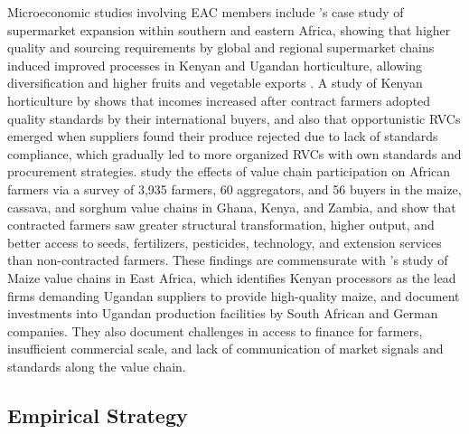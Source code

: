 \documentclass[a4paper]{article}
\begin{document}
Microeconomic studies involving EAC members include \citet{barrientos2016shifting}'s case study of supermarket expansion within southern and eastern Africa, showing that higher quality and sourcing requirements by global and regional supermarket chains induced improved processes in Kenyan and Ugandan horticulture, allowing diversification and higher fruits and vegetable exports \citep{world2020trading}. A study of Kenyan horticulture by \citet{krishnan2018origin} shows that incomes increased after contract farmers adopted quality standards by their international buyers, and also that opportunistic RVCs emerged when suppliers found their produce rejected due to lack of standards compliance, which gradually led to more organized RVCs with own standards and procurement strategies. \citet{dihel2018does} study the effects of value chain participation on African farmers via a survey of 3,935 farmers, 60 aggregators, and 56 buyers in the maize, cassava, and sorghum value chains in Ghana, Kenya, and Zambia, and show that contracted farmers saw greater structural transformation, higher output, and better access to seeds, fertilizers, pesticides, technology, and extension services than non-contracted farmers. These findings are commensurate with \citet{daly2016maize}'s study of Maize value chains in East Africa, which identifies Kenyan processors as the lead firms demanding Ugandan suppliers to provide high-quality maize, and document investments into Ugandan production facilities by South African and German companies. They also document challenges in access to finance for farmers, insufficient commercial scale, and lack of communication of market signals and standards along the value chain.   


\subsection{Empirical Strategy}
\end{document}
